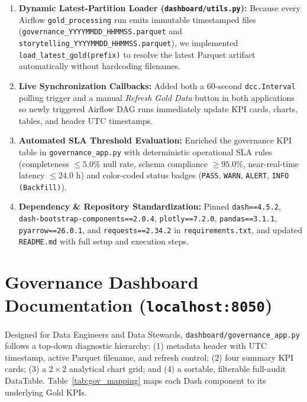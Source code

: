 \documentclass[11pt,a4paper]{article}
\begin{document}
\begin{enumerate}[leftmargin=1.4em, itemsep=3pt]
    \item \textbf{Dynamic Latest-Partition Loader (\texttt{dashboard/utils.py}):} Because every Airflow \texttt{gold\_processing} run emits immutable timestamped files (\texttt{governance\_YYYYMMDD\_HHMMSS.parquet} and \texttt{storytelling\_YYYYMMDD\_HHMMSS.parquet}), we implemented \texttt{load\_latest\_gold(prefix)} to resolve the latest Parquet artifact automatically without hardcoding filenames.
    \item \textbf{Live Synchronization Callbacks:} Added both a 60-second \texttt{dcc.Interval} polling trigger and a manual \textit{Refresh Gold Data} button in both applications so newly triggered Airflow DAG runs immediately update KPI cards, charts, tables, and header UTC timestamps.
    \item \textbf{Automated SLA Threshold Evaluation:} Enriched the governance KPI table in \texttt{governance\_app.py} with deterministic operational SLA rules (completeness $\le 5.0\%$ null rate, schema compliance $\ge 95.0\%$, near-real-time latency $\le 24.0\text{ h}$) and color-coded status badges (\texttt{PASS}, \texttt{WARN}, \texttt{ALERT}, \texttt{INFO (Backfill)}).
    \item \textbf{Dependency \& Repository Standardization:} Pinned \texttt{dash==4.5.2}, \texttt{dash-bootstrap-components==2.0.4}, \texttt{plotly==7.2.0}, \texttt{pandas==3.1.1}, \texttt{pyarrow==26.0.1}, and \texttt{requests==2.34.2} in \texttt{requirements.txt}, and updated \texttt{README.md} with full setup and execution steps.
\end{enumerate}

\section{Governance Dashboard Documentation (\texttt{localhost:8050})}

Designed for Data Engineers and Data Stewards, \texttt{dashboard/governance\_app.py} follows a top-down diagnostic hierarchy: (1) metadata header with UTC timestamp, active Parquet filename, and refresh control; (2) four summary KPI cards; (3) a $2 \times 2$ analytical chart grid; and (4) a sortable, filterable full-audit DataTable. Table~\ref{tab:gov_mapping} maps each Dash component to its underlying Gold KPIs.
\end{document}
